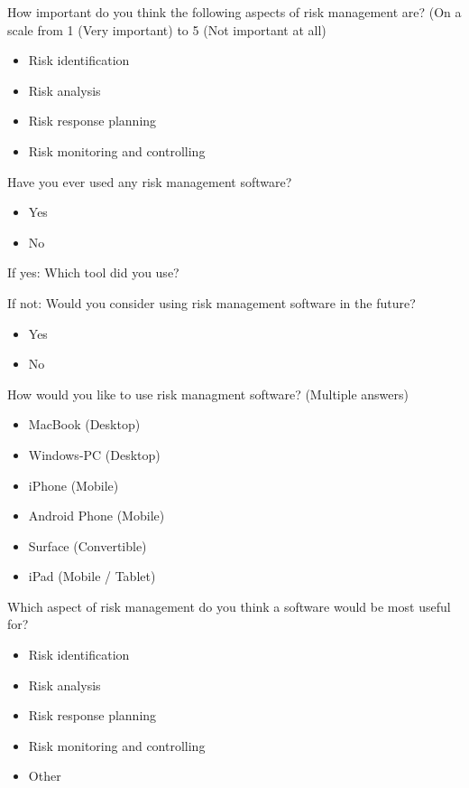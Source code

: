 How important do you think the following aspects of risk management are? (On a scale from 1 (Very important) to 5 (Not important at all) 
\begin{itemize}
	\item Risk identification
	\item Risk analysis
	\item Risk response planning
	\item Risk monitoring and controlling
\end{itemize}

Have you ever used any risk management software?
\begin{itemize}
	\item Yes
	\item No
\end{itemize}

If yes: Which tool did you use?

If not: Would you consider using risk management software in the future?
\begin{itemize}
	\item Yes
	\item No
\end{itemize}

How would you like to use risk managment software? (Multiple answers)
\begin{itemize}
	\item MacBook (Desktop)
	\item Windows-PC (Desktop)
	\item iPhone (Mobile)
	\item Android Phone (Mobile)
	\item Surface (Convertible)
	\item iPad (Mobile / Tablet)
\end{itemize}

Which aspect of risk management do you think a software would be most useful for?
\begin{itemize}
	\item Risk identification
	\item Risk analysis
	\item Risk response planning
	\item Risk monitoring and controlling
	\item Other
\end{itemize}


